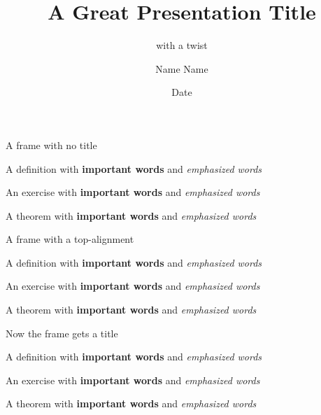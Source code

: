 \documentclass[aspectratio=169,10pt]{beamer}
\title{\textbf{A Great Presentation Title}}
\subtitle{with a twist}
\date{Date}
\author{Name Name}
\begin{document}
\maketitle

\begin{frame}
A frame with no title

\begin{definition}
A definition with \textbf{important words} and \emph{emphasized words}
\end{definition}

\begin{exercise}
An exercise with \textbf{important words} and \emph{emphasized words}
\end{exercise}

\begin{theorem}
A theorem with \textbf{important words} and \emph{emphasized words}
\end{theorem}
\end{frame}


\begin{frame}[t]
A frame with a top-alignment

\begin{definition}
A definition with \textbf{important words} and \emph{emphasized words}
\end{definition}

\begin{exercise}
An exercise with \textbf{important words} and \emph{emphasized words}
\end{exercise}

\begin{theorem}
A theorem with \textbf{important words} and \emph{emphasized words}
\end{theorem}
\end{frame}


\begin{frame}{Now the frame gets a title}

\begin{definition}[Me too]
A definition with \textbf{important words} and \emph{emphasized words}
\end{definition}

\begin{exercise}[Me too!]
An exercise with \textbf{important words} and \emph{emphasized words}
\end{exercise}

\begin{theorem}[Me too!!]
A theorem with \textbf{important words} and \emph{emphasized words}
\end{theorem}
\end{frame}
\end{document}
